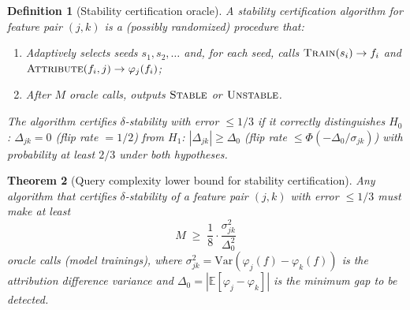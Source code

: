 \documentclass{article}
\newcommand{\Var}{\mathrm{Var}}
\newtheorem{theorem}{Theorem}
\newtheorem{definition}[theorem]{Definition}
\begin{document}
\begin{definition}[Stability certification oracle]
A \emph{stability certification algorithm} for feature pair $(j,k)$ is a
(possibly randomized) procedure that:
\begin{enumerate}
    \item Adaptively selects seeds $s_1, s_2, \ldots$ and, for each seed,
      calls $\textsc{Train}(s_i) \to f_i$ and
      $\textsc{Attribute}(f_i, j) \to \varphi_j(f_i)$;
    \item After $M$ oracle calls, outputs $\textsc{Stable}$ or
      $\textsc{Unstable}$.
\end{enumerate}
The algorithm \emph{certifies $\delta$-stability with error $\leq 1/3$}
if it correctly distinguishes
$H_0$: $\Delta_{jk} = 0$ (flip rate $= 1/2$) from
$H_1$: $|\Delta_{jk}| \geq \Delta_0$ (flip rate
$\leq \Phi(-\Delta_0/\sigma_{jk})$) with probability at least $2/3$
under both hypotheses.
\end{definition}

\begin{theorem}[Query complexity lower bound for stability certification]
\label{thm:query-complexity}
Any algorithm that certifies $\delta$-stability of a feature pair
$(j,k)$ with error $\leq 1/3$ must make at least
\[
    M \;\geq\; \frac{1}{8} \cdot \frac{\sigma_{jk}^2}{\Delta_0^2}
\]
oracle calls (model trainings), where
$\sigma_{jk}^2 = \Var(\varphi_j(f) - \varphi_k(f))$ is the attribution
difference variance and $\Delta_0 = |\mathbb{E}[\varphi_j - \varphi_k]|$
is the minimum gap to be detected.
\end{theorem}
\end{document}
